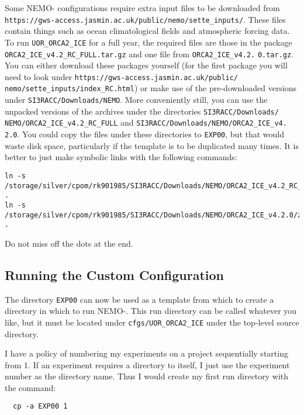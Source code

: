 Some NEMO-\SIcu{} configurations require extra input files to be downloaded from \verb|https://gws-access.jasmin.ac.uk/public/nemo/sette_inputs/|.
These files contain things such as ocean climatological fields and atmospheric forcing data.
To run \verb|UOR_ORCA2_ICE| for a full year, the required files are those in the package \verb|ORCA2_ICE_v4.2_RC_FULL.tar.gz| and one file from \verb|ORCA2_ICE_v4.2.| \verb|0.tar.gz|.
You can either download these packages yourself (for the first package you will need to look under \verb|https://gws-access.jasmin.ac.uk/public/| \verb|nemo/sette_inputs/index_RC.html|) or make use of the pre-downloaded versions under \verb|SI3RACC/Downloads/NEMO|.
More conveniently still, you can use the unpacked versions of the archives under the directories \verb|SI3RACC/Downloads/| \verb|NEMO/ORCA2_ICE_v4.2_RC_FULL| and \verb|SI3RACC/Downloads/NEMO/ORCA2_ICE_v4.| \verb|2.0|.
You could copy the files under these directories to \verb|EXP00|, but that would waste disk space, particularly if the template is to be duplicated many times.
It is better to just make symbolic links with the following commands:

\begin{verbatim}
ln -s /storage/silver/cpom/rk901985/SI3RACC/Downloads/NEMO/ORCA2_ICE_v4.2_RC_FULL/* .
ln -s /storage/silver/cpom/rk901985/SI3RACC/Downloads/NEMO/ORCA2_ICE_v4.2.0/zdfiwm_*.nc .
\end{verbatim}

\noindent{}Do not miss off the dots at the end.


\subsection{Running the Custom Configuration}
\label{sec:tutorial:subsec:running-custom}

The directory \verb|EXP00| can now be used as a template from which to create a directory in which to run NEMO-\SIcu{}.
This run directory can be called whatever you like, but it must be located under \verb|cfgs/UOR_ORCA2_ICE| under the top-level source directory.

I have a policy of numbering my experiments on a project sequentially starting from 1.
If an experiment requires a directory to itself, I just use the experiment number as the directory name.
Thus I would create my first run directory with the command:

\begin{verbatim}
  cp -a EXP00 1
\end{verbatim}

